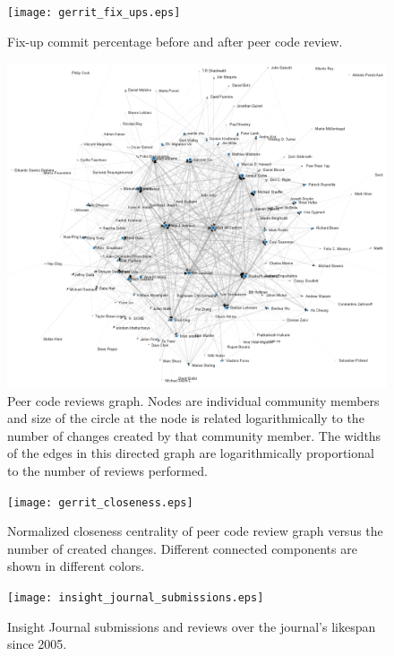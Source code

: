 \documentclass{frontiersENG} %
\begin{document}
\begin{figure}
  \centering
    \texttt{[image: gerrit\_fix\_ups.eps]}
    \caption{Fix-up commit percentage before and after peer code review.}
    \label{fig:gerrit_fix_ups}
\end{figure}

\begin{figure}
  \centering
    \showthe\textwidth
    \includegraphics[width=1.0\textwidth]{GerritGraphRender.png}
    \caption{Peer code reviews graph.  Nodes are individual community members and
      size of the circle at the node is related logarithmically to the number of changes
      created by that community member.  The widths of the edges in this directed
      graph are logarithmically proportional to the number of reviews performed.}
    \label{fig:gerrit_graph}
\end{figure}

\begin{figure}
  \centering
    \texttt{[image: gerrit\_closeness.eps]}
    \caption{Normalized closeness centrality of peer code review graph versus
      the number of created changes.  Different connected components are shown
      in different colors.}
    \label{fig:gerrit_closeness}
\end{figure}

\begin{figure}
  \centering
    \texttt{[image: insight\_journal\_submissions.eps]}
    \caption{Insight Journal submissions and reviews over the journal's
      likespan since 2005.}
    \label{fig:ij_submissions}
\end{figure}







\end{document}
